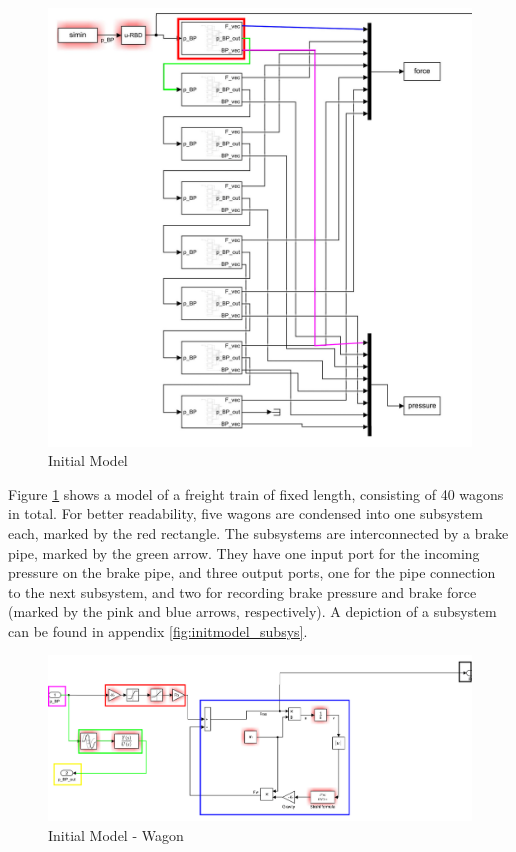 \begin{figure}[htb!]
	\centering
	\includegraphics[width=\linewidth]{./pic/initmodel_whole}
	\caption{Initial Model}
	\label{fig:initmodel_whole}
\end{figure}

\par\noindent
Figure \ref{fig:initmodel_whole} shows a model of a freight train of fixed length, consisting of 40 wagons in total. For better readability, five wagons are condensed into one subsystem each, marked by the red rectangle. The subsystems are interconnected by a brake pipe, marked by the green arrow. They have one input port for the incoming pressure on the brake pipe, and three output ports, one for the pipe connection to the next subsystem, and two for recording brake pressure and brake force (marked by the pink and blue arrows, respectively). A depiction of a subsystem can be found in appendix \ref{fig:initmodel_subsys}.  

\begin{figure}[htb!]
	\centering
	\includegraphics[width=\linewidth]{./pic/initmodel_wagon}
	\caption{Initial Model - Wagon}
	\label{fig:initmodel_wagon}
\end{figure}

